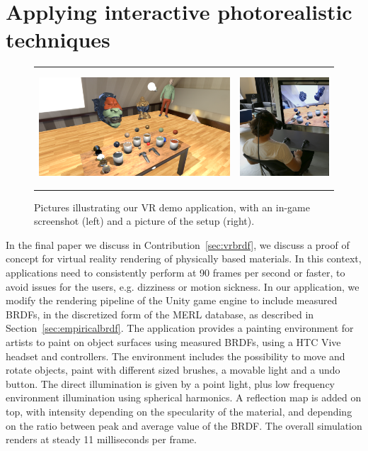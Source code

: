 \section{Applying interactive photorealistic techniques}
\begin{figure}[t]
\centering
\begin{tabular}{@{}c@{}c@{}}
	 \includegraphics[height = 4.3cm]{figures/screen1_crop} &
		 \includegraphics[height = 4.3cm]{figures/person} \\[-2.5ex]
\end{tabular}
  \caption{Pictures illustrating our VR demo application, with an in-game screenshot (left) and a picture of the setup (right). }
  \label{fig:vrbrdfimage}
\end{figure}
In the final paper we discuss in Contribution~\ref{sec:vrbrdf}, we discuss a proof of concept for virtual reality rendering of physically based materials. In this context, applications need to consistently perform at 90 frames per second or faster, to avoid issues for the users, e.g. dizziness or motion sickness. In our application, we modify the rendering pipeline of the Unity game engine to include measured BRDFs, in the discretized form of the MERL database, as described in Section~\ref{sec:empiricalbrdf}. The application provides a painting environment for artists to paint on object surfaces using measured BRDFs, using a HTC Vive headset and controllers. The environment includes the possibility to move and rotate objects, paint with different sized brushes, a movable light and a undo button. The direct illumination is given by a point light, plus low frequency environment illumination using spherical harmonics. A reflection map is added on top, with intensity depending on the specularity of the material, and depending on the ratio between peak and average value of the BRDF. The overall simulation renders at steady 11 milliseconds per frame.


